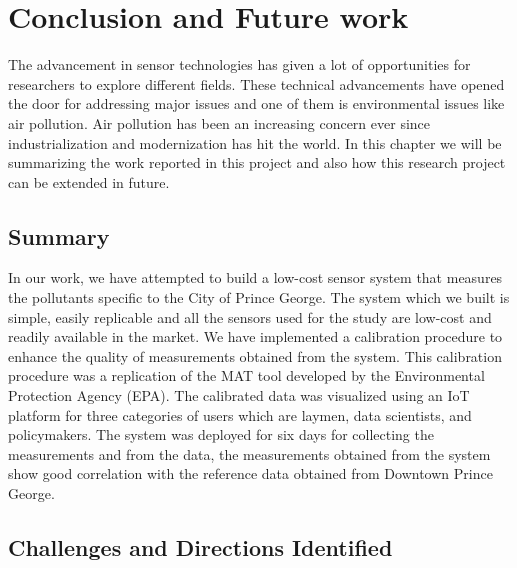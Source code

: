 \chapter{Conclusion and Future work}

The advancement in sensor technologies has given a lot of opportunities for researchers to explore different fields. These technical advancements have opened the door for addressing major issues and one of them is environmental issues like air pollution. Air pollution has been an increasing concern ever since industrialization and modernization has hit the world. In this chapter we will be summarizing the work reported in this project and also how this research project can be extended in future.
    
\section{Summary}

 In our work, we have attempted to build a low-cost sensor system that measures the pollutants specific to the City of Prince George. The system which we built is simple, easily replicable and all the sensors used for the study are low-cost and readily available in the market. We have implemented a calibration procedure to enhance the quality of measurements obtained from the system. This calibration procedure was a replication of the MAT tool developed by the Environmental Protection Agency (EPA). The calibrated data was visualized using an IoT platform for three categories of users which are laymen, data scientists, and policymakers. The system was deployed for six days for collecting the measurements and from the data, the measurements obtained from the system show good correlation with the reference data obtained from Downtown Prince George.

\section{Challenges and Directions Identified}

